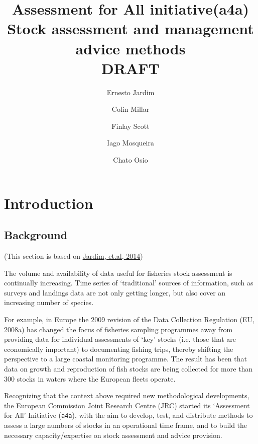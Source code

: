 \documentclass[a4paper,english,10pt]{article}\usepackage[]{graphicx}\usepackage[]{color}
\newcommand{\initiative}[1]{{\texttt{#1}}}
\begin{document}

\title{Assessment for All initiative(a4a) \\ Stock assessment and management advice methods \\ DRAFT}

\author[1]{Ernesto Jardim}
\author[1,2]{Colin Millar}
\author[1]{Finlay Scott}
\author[1]{Iago Mosqueira}
\author[1]{Chato Osio}

\maketitle
\tableofcontents
\newpage

\section{Introduction}



\subsection{Background}

(This section is based on \href{http://icesjms.oxfordjournals.org/content/early/2014/04/03/icesjms.fsu050.abstract}{Jardim, et.al, 2014})

The volume and availability of data useful for fisheries stock assessment is continually increasing. Time series of ‘traditional’ sources of information, such as surveys and landings data are not only getting longer, but also cover an increasing number of species.

For example, in Europe the 2009 revision of the Data Collection Regulation (EU, 2008a) has changed the focus of fisheries sampling programmes away from providing data for individual assessments of ‘key’ stocks (i.e. those that are economically important) to documenting fishing trips, thereby shifting the perspective to a large coastal monitoring programme. The result has been that data on growth and reproduction of fish stocks are being collected for more than 300 stocks in waters where the European fleets operate.

Recognizing that the context above required new methodological developments, the European Commission Joint Research Centre (JRC) started its ‘Assessment for All’ Initiative (\initiative{a4a}), with the aim to develop, test, and distribute methods to assess a large numbers of stocks in an operational time frame, and to build the necessary capacity/expertise on stock assessment and advice provision. 
\end{document}
